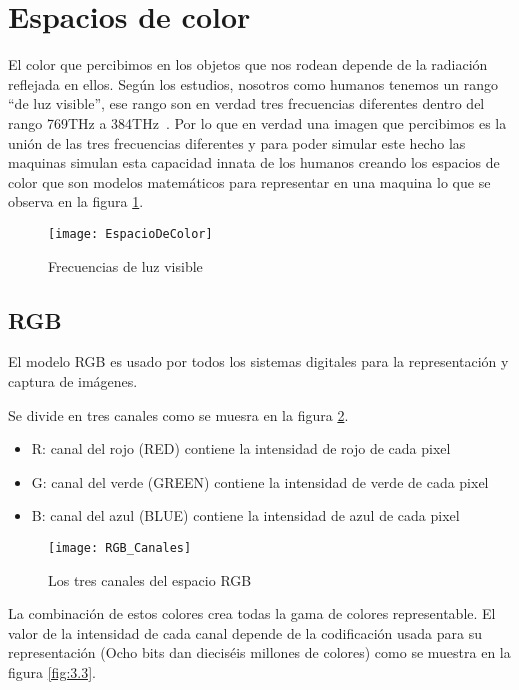 \section{Espacios de color }
El color que percibimos en los objetos que nos rodean depende de la radiación reflejada en ellos. Según los estudios, nosotros como humanos tenemos un rango ``de luz visible'', ese rango son en verdad tres frecuencias diferentes dentro del rango 769THz a 384THz~\cite{Manual:HAE}.
Por lo que en verdad una imagen que percibimos es la unión de las tres frecuencias diferentes y para poder simular este hecho las maquinas simulan esta capacidad innata de los humanos creando los espacios de color que son modelos matemáticos para representar en una maquina lo que se observa en la figura \ref{fig:3.1}.

\begin{figure}[h]
\centering
\texttt{[image: EspacioDeColor]}
\caption{Frecuencias de luz visible \cite{Manual:HAE}}
\label{fig:3.1}
\end{figure}

\subsection{RGB}
El modelo RGB es usado por todos los sistemas digitales para la representación y captura de imágenes.

Se divide en tres canales como se muesra en la figura \ref{fig:3.2}.

\begin{itemize}
	\item R: canal del rojo (RED) contiene la intensidad de rojo de cada pixel
	\item G: canal del verde (GREEN) contiene la intensidad de verde de cada pixel
	\item B: canal del azul (BLUE) contiene la intensidad de azul de cada pixel
\end{itemize}

\begin{figure}[h]
\centering
\texttt{[image: RGB\_Canales]}
\caption{Los tres canales del espacio RGB \cite{Manual:HAE}}
\label{fig:3.2}
\end{figure}
La combinación de estos colores crea todas la gama de colores representable.
El valor de la intensidad de cada canal depende de la codificación usada para su representación (Ocho bits dan dieciséis millones de colores) como se muestra en la figura  \ref{fig:3.3}.

